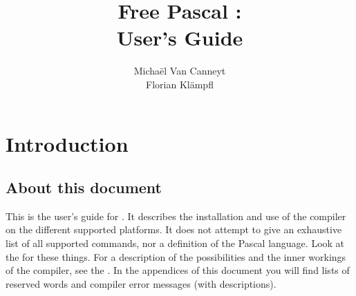 %
%
%
%
%

\begin{latexonly}
  \ifpdf
  \fi
\end{latexonly}

%
%
\makeindex
%
%

\title{Free Pascal :\\ User's Guide}

\author{Micha\"el Van Canneyt\\Florian Kl\"ampfl}
\maketitle
\tableofcontents

\chapter{Introduction}

\section{About this document}
This is the user's guide for \fpc . It describes the installation and
use of the \fpc compiler on the different supported platforms.
It does not attempt to give an exhaustive list of all supported commands,
nor a definition of the Pascal language. Look at the
 for these things. For a description of the possibilities and the 
inner workings of the compiler, see the
\progref . In the appendices of this document you will find lists of
reserved words and compiler error messages (with descriptions).

